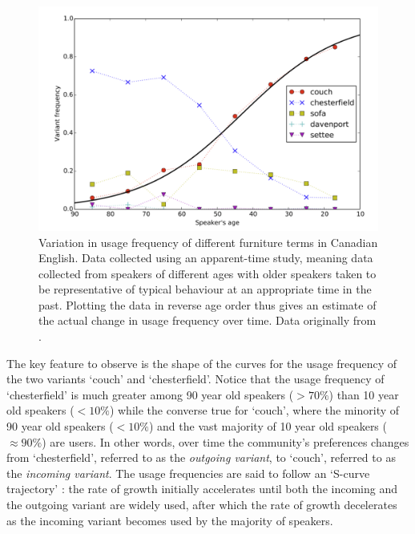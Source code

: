 \documentclass[12pt]{article}
\begin{document}
\begin{figure}[h]
\begin{center}
\includegraphics[width=\textwidth]{sofa.png}
\end{center}
\caption{Variation in usage frequency of different furniture terms in Canadian English. Data collected using an apparent-time study, meaning data collected from speakers of different ages with older speakers taken to be representative of typical behaviour at an appropriate time in the past. Plotting the data in reverse age order thus gives an estimate of the actual change in usage frequency over time. Data originally from \cite{20}.}\label{sofa}
\end{figure}

The key feature to observe is the shape of the curves for the usage frequency of the two variants `couch' and `chesterfield'. Notice that the usage frequency of `chesterfield' is much greater among 90 year old speakers ($>70\%$) than 10 year old speakers ($<10\% $) while the converse true for `couch', where the minority of 90 year old speakers ($<10\% $) and the vast majority of 10 year old speakers ($\approx 90\%$) are users. In other words, over time the community's preferences changes from `chesterfield', referred to as the \emph{outgoing variant}, to `couch', referred to as the \emph{incoming variant}. The usage frequencies are said to follow an `S-curve trajectory' \cite{Scurve}: the rate of growth initially accelerates until both the incoming and  the outgoing variant are widely used, after which the rate of growth decelerates as the incoming variant becomes used by the majority of speakers. 
\end{document}

